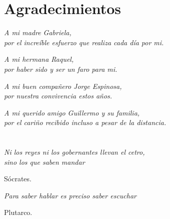 \cleardoublepage %
\chapter*{Agradecimientos}
\setlength{\leftmargin}{0.5\textwidth}
\setlength{\parsep}{0cm}
\addtolength{\topsep}{0.5cm}
\begin{flushright}
\small\em{
A mi madre Gabriela,\\
por el increíble esfuerzo que realiza cada día por mi. 
}
\end{flushright}
\begin{flushright}
\small\em{
A mi hermana Raquel,\\
por haber sido y ser un faro para mi. 
}
\end{flushright}
\begin{flushright}
\small\em{
A mi buen compañero Jorge Espinosa,\\
por nuestra convivencia estos años. 
}
\end{flushright}
\begin{flushright}
\small\em{
A mi querido amigo Guillermo y su familia,\\
por el cariño recibido incluso a pesar de la distancia. 
}
\end{flushright}

\cleardoublepage %
\chapter*{}
\setlength{\leftmargin}{0.5\textwidth}
\setlength{\parsep}{0cm}
\addtolength{\topsep}{0.5cm}
\begin{flushright}
\small\em{
Ni los reyes ni los gobernantes llevan el cetro,\\
sino los que saben mandar\\ 
}
\end{flushright}
\begin{flushright}
\small{
Sócrates.
}
\end{flushright}

\begin{flushright}
\small\em{
Para saber hablar es preciso saber escuchar\\
}
\end{flushright}
\begin{flushright}
\small{
Plutarco.
}
\end{flushright}
\cleardoublepage %
